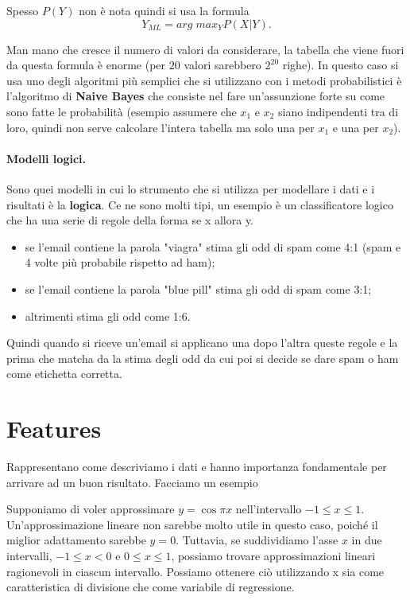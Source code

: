 Spesso $P(Y)$ non è nota quindi si usa la formula
\begin{equation}
    Y_{ML} = arg\; max_Y P(X|Y).
\end{equation}

Man mano che cresce il numero di valori da considerare, la tabella che viene fuori da questa formula è enorme (per $20$ valori sarebbero $2^{20}$ righe). In questo caso si usa uno degli algoritmi più semplici che si utilizzano con i metodi probabilistici è l'algoritmo di \textbf{Naive Bayes} che consiste nel fare un'assunzione forte su come sono fatte le probabilità (esempio assumere che $x_1$ e $x_2$ siano indipendenti tra di loro, quindi non serve calcolare l'intera tabella ma solo una per $x_1$ e una per $x_2$). 

\paragraph{Modelli logici.} Sono quei modelli in cui lo strumento che si utilizza per modellare i dati e i risultati è la \textbf{logica}. Ce ne sono molti tipi, un esempio è un classificatore logico che ha una serie di regole della forma se x allora y.
\begin{itemize}
    \item se l'email contiene la parola "viagra" stima gli odd di spam come 4:1 (spam e 4 volte più probabile rispetto ad ham);
    \item se l'email contiene la parola "blue pill" stima gli odd di spam come 3:1;
    \item altrimenti stima gli odd come 1:6.
\end{itemize}
Quindi quando si riceve un'email si applicano una dopo l'altra queste regole e la prima che matcha da la stima degli odd da cui poi si decide se dare spam o ham come etichetta corretta.

\section{Features}
Rappresentano come descriviamo i dati e hanno importanza fondamentale per arrivare ad un buon risultato. Facciamo un esempio

Supponiamo di voler approssimare $y = \cos{\pi x} $ nell'intervallo $-1 \le x \le 1$. Un'approssimazione lineare non sarebbe molto utile in questo caso, poiché il miglior adattamento sarebbe $y = 0$. Tuttavia, se suddividiamo l'asse $x$ in due intervalli, $-1 \le x < 0$ e $0 \le x \le 1$, possiamo trovare approssimazioni lineari ragionevoli in ciascun intervallo. Possiamo ottenere ciò utilizzando x sia come caratteristica di divisione che come variabile di regressione.

